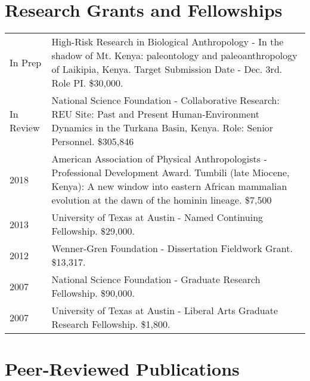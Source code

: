 \documentclass{article}
\begin{document}
\section*{Research Grants and Fellowships}
\begin{tabular}{p{}p{}}
In Prep & High-Risk Research in Biological Anthropology - In the shadow of Mt. Kenya: paleontology and paleoanthropology of Laikipia, Kenya. Target Submission Date - Dec. 3rd. Role PI. \$30,000.\\[4pt]
In Review &  National Science Foundation - Collaborative Research: REU Site: Past and Present Human-Environment Dynamics in the Turkana Basin, Kenya. Role: Senior Personnel. \$305,846\\[4pt]
2018 & American Association of Physical Anthropologists - Professional Development Award. Tumbili (late Miocene, Kenya): A new window into eastern African mammalian evolution at the dawn of the hominin lineage. \$7,500\\[4pt]
2013 &  University of Texas at Austin - Named Continuing Fellowship. \$29,000.\\[4pt]
2012  & Wenner-Gren Foundation - Dissertation Fieldwork Grant. \$13,317.\\[4pt]
2007 &  National Science Foundation - Graduate Research Fellowship. \$90,000.\\[4pt]
2007 &  University of Texas at Austin - Liberal Arts Graduate Research Fellowship. \$1,800.\\[4pt]

\end{tabular}



\section*{Peer-Reviewed Publications}
\end{document}
